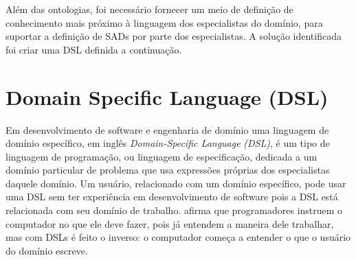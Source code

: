 %
Além das ontologias, foi necessário fornecer um meio de definição
de conhecimento mais próximo à linguagem dos especialistas do domínio,
para suportar a definição de SADs por parte dos especialistas. A solução
identificada foi criar uma \foreignlanguage{english}{DSL} definida
a continuação.
%

\section{Domain Specific Language (DSL)\foreignlanguage{brazil}{ }}

%
Em desenvolvimento de software e engenharia de domínio uma linguagem
de domínio específico, em inglês \foreignlanguage{english}{\emph{Domain-Specific
Language}}\emph{ (DSL)}, é um tipo de linguagem de programação, ou
linguagem de especificação, dedicada a um domínio particular de problema
que usa expressões próprias dos especialistas daquele domínio. Um
usuário, relacionado com um domínio específico, pode usar uma DSL
sem ter experiência em desenvolvimento de software pois a DSL está
relacionada com seu domínio de trabalho. \citet{fowler2010domain}
afirma que programadores instruem o computador no que ele deve fazer,
pois já entendem a maneira dele trabalhar, mas com \foreignlanguage{english}{DSLs}
é feito o inverso: o computador começa a entender o que o usuário
do domínio escreve.


